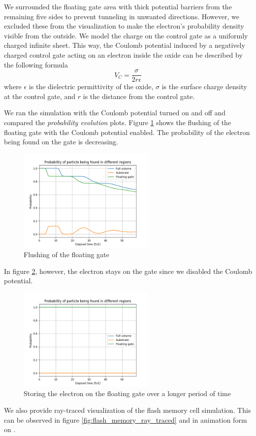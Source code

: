 We surrounded the floating gate area with thick potential barriers from the remaining five sides to prevent tunneling in unwanted directions. However, we excluded these from the visualization to make the electron's probability density visible from the outside.
We model the charge on the control gate as a uniformly charged infinite sheet.
This way, the Coulomb potential induced by a negatively charged control gate acting on an electron inside the oxide can be described by the following formula
\begin{equation}
	\label{eq:coulomb_potential}
	V_C = \frac{\sigma}{2r\epsilon}
\end{equation}
where $\epsilon$ is the dielectric permittivity of the oxide, $\sigma$ is the surface charge density at the control gate, and $r$ is the distance from the control gate.

We ran the simulation with the Coulomb potential turned on and off and compared the \textit{probability evolution} plots.
Figure \ref{fig:flash_flush_plot} shows the flushing of the floating gate with the Coulomb potential enabled.
The probability of the electron being found on the gate is decreasing.
\begin{figure}
	\centering
	\includegraphics[width=0.6\textwidth]{figures/flash_flush.png}
	\caption{Flushing of the floating gate}
	\label{fig:flash_flush_plot}
\end{figure}
In figure \ref{fig:flash_keep}, however, the electron stays on the gate since we disabled the Coulomb potential.
\begin{figure}
	\centering
	\includegraphics[width=0.6\textwidth]{figures/flash_keep.png}
	\caption{Storing the electron on the floating gate over a longer period of time}
	\label{fig:flash_keep}
\end{figure}
We also provide ray-traced visualization of the flash memory cell simulation.
This can be observed in figure \ref{fig:flash_memory_ray_traced} and in animation form on \url{} .




